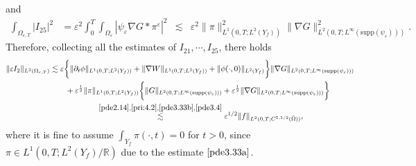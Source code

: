\documentclass[13pt,CJK]{article}
\theoremstyle{plain}                       %
\theoremstyle{remark}
\numberwithin{equation}{section}
\begin{document}
and
\begin{equation*}
\begin{aligned}
\int_{\Omega_{\varepsilon,T}}|I_{25}|^2
&=\varepsilon^2\int_{0}^{T}\int_{\Omega_{\varepsilon}}|
\psi_{\varepsilon}
\nabla G \ast \pi^{\varepsilon}|^2
&\lesssim&
\varepsilon^2\|\pi\|^2_{L^1(0,T;L^2(Y_f))}
\|\nabla G\|^2_{L^2(0,T;L^{\infty}
(\text{supp}(\psi_{\varepsilon})))}.
\end{aligned}
\end{equation*}
Therefore, collecting all the estimates of
$I_{21},\cdots, I_{25}$, there holds
\begin{equation}\label{pde5.4}
\begin{aligned}
\|\varepsilon
I_2\|_{L^2(\Omega_{\varepsilon,T})}
& \lesssim
\varepsilon
\bigg\{\|\partial_t\phi\|_{L^1(0,T;L^2(Y_f))}+
\|\nabla W\|_{L^1(0,T;L^2(Y_f))}
+\|\phi(\cdot,0)\|_{L^2(Y_f)}\bigg\}\|\nabla G\|_{L^2(0,T;L^{\infty}
(\text{supp}(\psi_{\varepsilon})))}\\
&\qquad+\varepsilon^{\frac{1}{2}}
\|\pi\|_{L^1(0,T;L^2(Y_f))}
\bigg\{\|G\|_{L^2(0,T;L^{\infty}
(\text{supp}(\psi_{\varepsilon})))}
+\varepsilon^{\frac{1}{2}}\|\nabla G\|_{L^2(0,T;L^{\infty}
(\text{supp}(\psi_{\varepsilon})))}
\bigg\}\\
&\qquad\qquad\qquad
\overset{\eqref{pde2.14},\eqref{pri:4.2},\eqref{pde3.33b},\eqref{pde3.4}}{\lesssim}
\varepsilon^{1/2}\|f\|_{L^2(0,T;C^{1,1/2}(\bar{\Omega}))},
\end{aligned}
\end{equation}
where it is fine to assume $\int_{Y_f}\pi(\cdot,t)=0$ 
for $t>0$, since $\pi\in L^1(0,T;L^2(Y_f)/\mathbb{R})$
due to the estimate $\eqref{pde3.33a}$.
\end{document}
